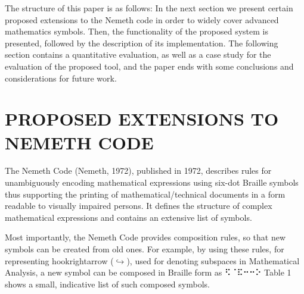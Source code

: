 \documentclass[11.5pt]{sig-alternate} %
\begin{document}
\begin{large}
The structure of this paper is as follows: In the next section we present certain proposed extensions to the Nemeth code in order to widely cover advanced mathematics symbols. Then, the functionality of the proposed system is presented, followed by the description of its implementation. The following section contains a quantitative evaluation, as well as a case study for the evaluation of the proposed tool, and the paper ends with some conclusions and considerations for future work.

\section*{PROPOSED EXTENSIONS TO NEMETH CODE}

The Nemeth Code (Nemeth, 1972), published in 1972, describes rules for unambiguously encoding mathematical expressions using six-dot Braille symbols thus supporting the printing of mathematical/technical documents in a form readable to visually impaired persons. It defines the structure of complex mathematical expressions and contains an extensive list of symbols.

Most importantly, the Nemeth Code provides composition rules, so that new symbols can be created from old ones. For example, by using these rules, for representing hookrightarrow ($\hookrightarrow$), used for denoting subspaces in Mathematical Analysis, a new symbol can be composed in Braille form as  ⠫⠈⠯⠒⠒⠕  Table 1 shows a small, indicative list of such composed symbols.


\end{large}
\end{document}
